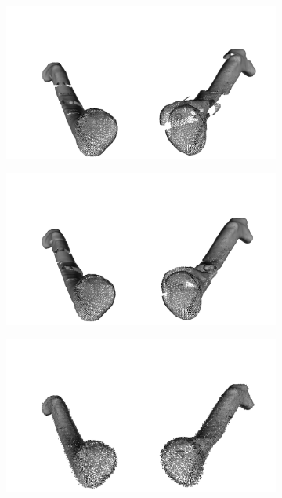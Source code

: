 \begin{figure}[htp]
\begin{subfigure}[b]{.5\textwidth}
    \caption{}
  \end{subfigure}
  \hfill
  \begin{subfigure}[b]{.5\textwidth}
    \centering
    \includegraphics[width=.95\textwidth]{imagenes/chapter2/clavicula/clavicula_3.png}
    \caption{}
  \end{subfigure}
  \begin{subfigure}[b]{.5\textwidth}
    \centering
    \includegraphics[width=.95\textwidth]{imagenes/chapter2/clavicula/clavicula_4.png}
    \caption{}
  \end{subfigure}
  \begin{subfigure}[b]{.5\textwidth}
    \centering
    \includegraphics[width=.95\textwidth]{imagenes/chapter2/clavicula/clavicula_5.png}

\end{subfigure}
\end{figure}
